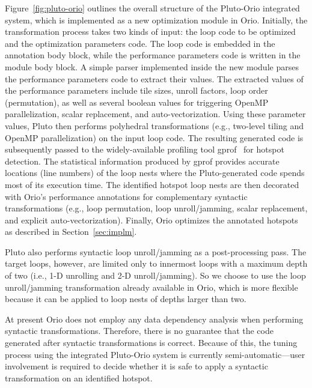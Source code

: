 Figure~\ref{fig:pluto-orio} outlines the overall structure of the
Pluto-Orio integrated system, which is implemented as a new
optimization module in Orio. Initially, the transformation process
takes two kinds of input: the loop code to be optimized and the
optimization parameters code. The loop code is embedded in the
annotation body block, while the performance parameters code is
written in the module body block. A simple parser implemented inside
the new module parses the performance parameters code to extract their
values. The extracted values of the performance parameters include
tile sizes, unroll factors, loop order (permutation), as well as
several boolean values for triggering OpenMP parallelization, scalar
replacement, and auto-vectorization. Using these parameter values,
Pluto then performs polyhedral transformations (e.g., two-level tiling
and OpenMP parallelization) on the input loop code. The resulting
generated code is subsequently passed to the widely-available
profiling tool gprof~\cite{gprof} for hotspot detection. The
statistical information produced by gprof provides accurate locations
(line numbers) of the loop nests where the Pluto-generated code spends
most of its execution time. The identified hotspot loop nests are then
decorated with Orio's performance annotations for complementary
syntactic transformations (e.g., loop permutation, loop
unroll/jamming, scalar replacement, and explicit
auto-vectorization). Finally, Orio optimizes the annotated hotspots as
described in Section~\ref{sec:implm}.

Pluto also performs syntactic loop unroll/jamming as a post-processing
pass. The target loops, however, are limited only to innermost loops with a
maximum depth of two (i.e., 1-D unrolling and 2-D unroll/jamming). So we
choose to use the loop unroll/jamming transformation already available in
Orio, which is more flexible because it can be applied to loop nests of
depths larger than two.



At present Orio does not employ any data dependency analysis when performing
syntactic transformations. Therefore, there is no guarantee that the code
generated after syntactic transformations is correct. Because of this, the
tuning process using the integrated Pluto-Orio system is currently
semi-automatic---user involvement is required to decide whether it is safe
to apply a syntactic transformation on an identified hotspot.



